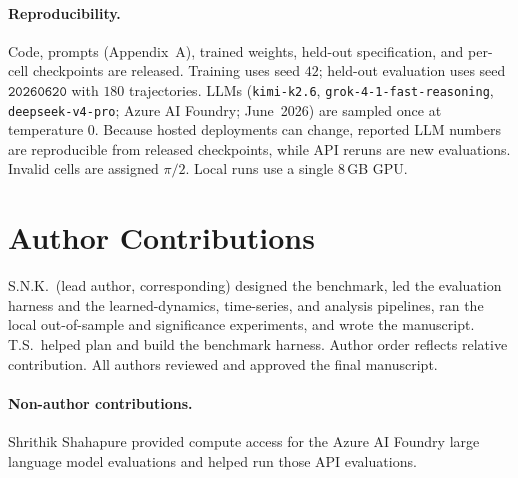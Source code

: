 \documentclass{article}
\begin{document}
\paragraph{Reproducibility.} Code, prompts (Appendix~A), trained weights, held-out
specification, and per-cell checkpoints are released. Training uses seed $42$; held-out
evaluation uses seed $\texttt{20260620}$ with $180$ trajectories. LLMs
(\texttt{kimi-k2.6}, \texttt{grok-4-1-fast-reasoning}, \texttt{deepseek-v4-pro}; Azure AI
Foundry; June~2026) are sampled once at temperature $0$. Because hosted deployments can
change, reported LLM numbers are reproducible from released checkpoints, while API reruns are
new evaluations. Invalid cells are assigned $\pi/2$. Local runs use a single 8\,GB GPU.

\section*{Author Contributions}
S.N.K.\ (lead author, corresponding) designed the benchmark, led the evaluation harness and
the learned-dynamics, time-series, and analysis pipelines, ran the local out-of-sample and
significance experiments, and wrote the manuscript. T.S.\ helped plan and build the benchmark
harness. Author order reflects relative contribution. All authors reviewed and approved the
final manuscript.

\paragraph{Non-author contributions.} Shrithik Shahapure provided compute access for the
Azure AI Foundry large language model evaluations and helped run those API evaluations.

\small



\normalsize
\end{document}
